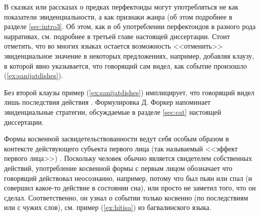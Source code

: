 В сказках или рассказах о предках перфектоиды могут употребляться не как показатели эвиденциальности, а как признаки жанра (об этом подробнее в разделе \ref{sec:intro3}. Об этом, как и об употреблении перфектоидов в разного рода нарративах, см. подробнее в третьей главе настоящей диссертации. Стоит отметить, что во многих языках остается возможность <<отменить>> эвиденциальное значение в некоторых предложениях, например, добавляя клаузу, в которой явно указывается, что говорящий сам видел, как событие произошло (\ref{ex:sanijatdishes}).


Без второй клаузы пример (\ref{ex:sanijatdishes}) имплицирует, что говорящий видел лишь последствия действия \citep[496]{forker2018evid}. Формулировка Д. Форкер напоминает эвиденциальные стратегии, обсуждаемые в разделе \ref{sec:cat} настоящей диссертации. 
\par Формы косвенной засвидетельствованности ведут себя особым образом в контексте действующего субъекта первого лица (так называемый <<эффект первого лица>>) \citep[220--223]{aikhenvald2004}. Поскольку человек обычно является свидетелем собственных действий, употребление косвенной формы с первым лицом обозначает что говорящий действовал неосознанно, например, потому что был пьян или спал (и совершил какое-то действие в состоянии сна), или просто не заметил того, что он сделал. Соответственно, он узнал о событии только косвенно (по последствиям или с чужих слов), см. пример (\ref{ex:hitisa}) из багвалинского языка.


